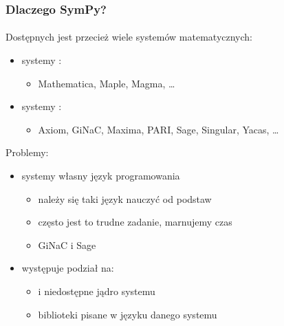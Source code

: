 \documentclass{beamer}
\begin{document}
\begin{frame}
    \frametitle{Dlaczego SymPy?}
    \framesubtitle{}

    Dostępnych jest przecież wiele systemów matematycznych:
    \pause
    \begin{itemize}
        \item systemy :
            \begin{itemize}
                \item Mathematica, Maple, Magma, \ldots
            \end{itemize}
            \pause
        \item systemy :
            \begin{itemize}
                \item Axiom, GiNaC, Maxima, PARI, Sage, Singular, Yacas, \ldots
            \end{itemize}
    \end{itemize}
    \pause
    Problemy:
    \begin{itemize}
        \item systemy  własny język programowania
            \begin{itemize}
                \item należy się taki język nauczyć od podstaw
                \item często jest to trudne zadanie, marnujemy czas
                \item {} GiNaC i Sage
            \end{itemize}
            \pause
        \item występuje podział na:
            \begin{itemize}
                \item {} i niedostępne jądro systemu
                \item biblioteki pisane w języku danego systemu
            \end{itemize}
    \end{itemize}
\end{frame}
\end{document}
